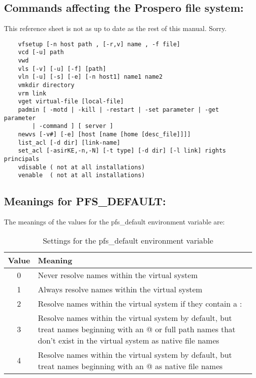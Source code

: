 \subsection*{Commands affecting the Prospero file system:}

This reference sheet is not as up to date as the rest of this manual.
Sorry.

\begin{verbatim}
    vfsetup [-n host path , [-r,v] name , -f file]
    vcd [-u] path
    vwd
    vls [-v] [-u] [-f] [path]
    vln [-u] [-s] [-e] [-n host1] name1 name2
    vmkdir directory
    vrm link
    vget virtual-file [local-file]
    padmin [ -motd | -kill | -restart | -set parameter | -get parameter 
		| -command ] [ server ]
    newvs [-v#] [-e] [host [name [home [desc_file]]]]
    list_acl [-d dir] [link-name]
    set_acl [-asirKE,-n,-N] [-t type] [-d dir] [-l link] rights principals
    vdisable ( not at all installations)
    venable  ( not at all installations)
\end{verbatim}

\vspace{-.25in}
\subsection*{Meanings for PFS\_DEFAULT:}
\vspace{-.12in}

The meanings of the values for the {\sc pfs\_default} environment variable
are:

\begin{table}[h]
\begin{center}
\caption{Settings for the {\sc pfs\_default} environment variable}
\vspace{0.1in}
\begin{tabular}{|c|p{3.9in}|} \hline
Value & Meaning \\ \hline \hline
0 & Never resolve names within the virtual system \\ \hline 
1 & Always resolve names within the virtual system \\ \hline 
2 & Resolve names within the virtual system if they contain a : \\ \hline 
3 & Resolve names within the virtual system by default, but 
treat names beginning with an @ or full path names that 
don't exist in the virtual system as native file names \\ \hline 
4 & Resolve names within the virtual system by default, but 
treat names beginning with an @ as native file names \\ \hline
\end{tabular}
\vspace{-0.1in}
\end{center}
\end{table}


